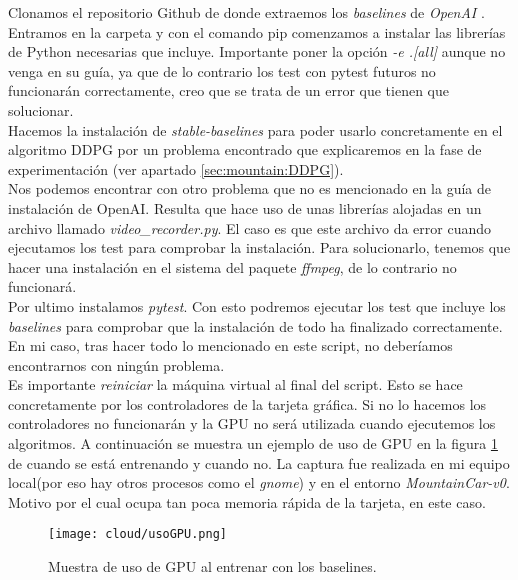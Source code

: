 \documentclass[11pt,fleqn]{book} %
\begin{document}
Clonamos el repositorio Github de donde extraemos los \textit{baselines} de \textit{OpenAI} \cite{article:baselines}. Entramos en la carpeta y con el comando pip comenzamos a instalar las librerías de Python necesarias que incluye. Importante poner la opción \textit{-e .[all]} aunque no venga en su guía, ya que de lo contrario los test con pytest futuros no funcionarán correctamente, creo que se trata de un error que tienen que solucionar. \\

Hacemos la instalación de \textit{stable-baselines}\cite{article:stablebaselinesinstalation} para poder usarlo concretamente en el algoritmo DDPG por un problema encontrado que explicaremos en la fase de experimentación (ver apartado \ref{sec:mountain:DDPG}). \\

Nos podemos encontrar con otro problema que no es mencionado en la guía de instalación de OpenAI. Resulta que hace uso de unas librerías alojadas en un archivo llamado \textit{video\_recorder.py}. El caso es que este archivo da error cuando ejecutamos los test para comprobar la instalación. Para solucionarlo, tenemos que hacer una instalación en el sistema del paquete \textit{ffmpeg}, de lo contrario no funcionará. \\

Por ultimo instalamos \textit{pytest}. Con esto podremos ejecutar los test que incluye los \textit{baselines} para comprobar que la instalación de todo ha finalizado correctamente. En mi caso, tras hacer todo lo mencionado en este script, no deberíamos encontrarnos con ningún problema. \\

Es importante \textit{reiniciar} la máquina virtual al final del script. Esto se hace concretamente por los controladores de la tarjeta gráfica. Si no lo hacemos los controladores no funcionarán y la GPU no será utilizada cuando ejecutemos los algoritmos. A continuación se muestra un ejemplo de uso de GPU en la figura \ref{fig:usoGPU} de cuando se está entrenando y cuando no. La captura fue realizada en mi equipo local(por eso hay otros procesos como el \textit{gnome}) y en el entorno \textit{MountainCar-v0}. Motivo por el cual ocupa tan poca memoria rápida de la tarjeta, en este caso.\cite{article:configuration}\cite{article:configuration2}\cite{article:configuration3}\\ 

\begin{figure}[H]
	\centering\texttt{[image: cloud/usoGPU.png]}
	\caption{Muestra de uso de GPU al entrenar con los baselines.}
	\label{fig:usoGPU} %
\end{figure} 
\end{document}
